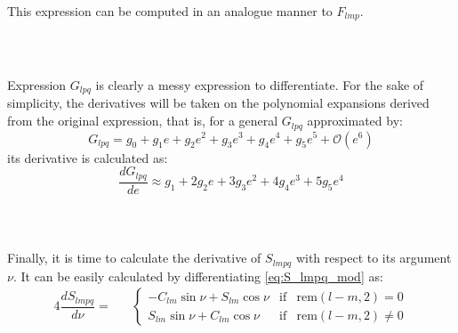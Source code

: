 					\indent This expression can be computed in an analogue manner to $F_{lmp}$.
					\subparagraph{\\}
					\indent Expression $G_{lpq}$ is clearly a messy expression to differentiate. For the sake of simplicity, the derivatives will be taken on the polynomial expansions derived from the original expression, that is, for a general $G_{lpq}$ approximated by:
					\[
					G_{lpq} = g_0 + g_1 e + g_2 e^2 + g_3 e^3 + g_4 e^4 + g_5 e^5 + \mathcal{O}(e^6)
					\]
					\noindent its derivative is calculated as:
					\begin{equation}
					\dfrac{dG_{lpq}}{de} \approx g_1 + 2g_2 e + 3 g_3 e^2 + 4 g_4 e^3 + 5 g_5 e^4
					\label{eq:dG_lpq}
					\end{equation}
					\subparagraph{\\} 
					\indent Finally, it is time to calculate the derivative of $S_{lmpq}$ with respect to its argument $\nu$. It can be easily calculated by differentiating \eqref{eq:S_lmpq_mod} as:
					\begin{alignat}{4}
					\label{eq:dS_lmpq} \dfrac{dS_{lmpq}}{d\nu} = && \left\{ \begin{array}{ccc}
					-C_{lm} \sin \nu	+ S_{lm} \cos \nu & \text{if} & \text{rem}(l - m, 2) = 0\\ [1em]
		 			S_{lm} \sin \nu 	+ C_{lm} \cos \nu & \text{if} & \text{rem}(l - m, 2)  \neq 0	
					\end{array}\right.
					\end{alignat}
